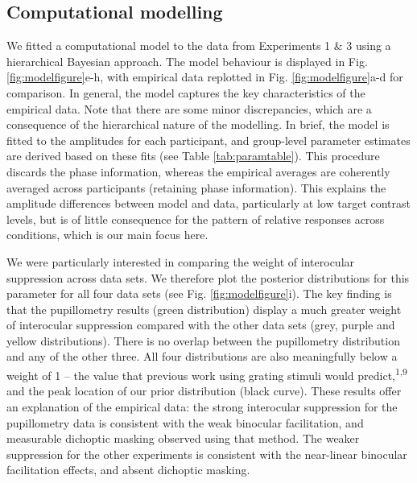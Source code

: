 \documentclass[
]{article}
\begin{document}
\hypertarget{computational-modelling}{%
\subsection{Computational modelling}\label{computational-modelling}}

We fitted a computational model to the data from Experiments 1 \& 3 using a hierarchical Bayesian approach. The model behaviour is displayed in Fig. \ref{fig:modelfigure}e-h, with empirical data replotted in Fig. \ref{fig:modelfigure}a-d for comparison. In general, the model captures the key characteristics of the empirical data. Note that there are some minor discrepancies, which are a consequence of the hierarchical nature of the modelling. In brief, the model is fitted to the amplitudes for each participant, and group-level parameter estimates are derived based on these fits (see Table \ref{tab:paramtable}). This procedure discards the phase information, whereas the empirical averages are coherently averaged across participants (retaining phase information). This explains the amplitude differences between model and data, particularly at low target contrast levels, but is of little consequence for the pattern of relative responses across conditions, which is our main focus here.

We were particularly interested in comparing the weight of interocular suppression across data sets. We therefore plot the posterior distributions for this parameter for all four data sets (see Fig. \ref{fig:modelfigure}i). The key finding is that the pupillometry results (green distribution) display a much greater weight of interocular suppression compared with the other data sets (grey, purple and yellow distributions). There is no overlap between the pupillometry distribution and any of the other three. All four distributions are also meaningfully below a weight of 1 -- the value that previous work using grating stimuli would predict,\textsuperscript{1,9} and the peak location of our prior distribution (black curve). These results offer an explanation of the empirical data: the strong interocular suppression for the pupillometry data is consistent with the weak binocular facilitation, and measurable dichoptic masking observed using that method. The weaker suppression for the other experiments is consistent with the near-linear binocular facilitation effects, and absent dichoptic masking.
\end{document}
